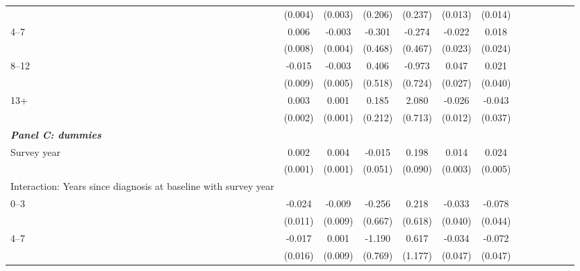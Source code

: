 \documentclass[12pt,english]{article}
\begin{document}
\begin{table}[p]
\begin{center}
\begin{adjustbox}{max width=.9\linewidth}
\begin{threeparttable}
{\begin{tabular}{l*{6}{S S}}
						&  (0.004)         &  (0.003)         &  (0.206)         &  (0.237)         &  (0.013)         &  (0.014)         \\
						\hspace*{10mm}4--7 &   0.006         &   -0.003         &   -0.301         &   -0.274         &   -0.022         &    0.018         \\
						&  (0.008)         &  (0.004)         &  (0.468)         &  (0.467)         &  (0.023)         &  (0.024)         \\
						\hspace*{10mm}8--12 &  -0.015\sym{*}  &   -0.003         &    0.406         &   -0.973         &    0.047\sym{*}  &    0.021         \\
						&  (0.009)         &  (0.005)         &  (0.518)         &  (0.724)         &  (0.027)         &  (0.040)         \\
						\hspace*{10mm}13+ &    0.003         &    0.001         &    0.185         &    2.080\sym{***}&   -0.026\sym{**} &   -0.043         \\
						&  (0.002)         &  (0.001)         &  (0.212)         &  (0.713)         &  (0.012)         &  (0.037)         \\
						\textit{\textbf{Panel C: dummies}} &&&&&&\\
						Survey year     &    0.002\sym{***}&    0.004\sym{***}&   -0.015         &    0.198\sym{**} &    0.014\sym{***}&    0.024\sym{***}\\
						&  (0.001)         &  (0.001)         &  (0.051)         &  (0.090)         &  (0.003)         &  (0.005)         \\
						Interaction: Years since diagnosis at baseline with survey year &&&&&&\\
						\hspace*{10mm}0--3&    -0.024\sym{**} &   -0.009         &   -0.256         &    0.218         &   -0.033         &   -0.078\sym{*}  \\
						&  (0.011)         &  (0.009)         &  (0.667)         &  (0.618)         &  (0.040)         &  (0.044)         \\
						\hspace*{10mm}4--7 &  -0.017         &    0.001         &   -1.190         &    0.617         &   -0.034         &   -0.072         \\
						&  (0.016)         &  (0.009)         &  (0.769)         &  (1.177)         &  (0.047)         &  (0.047)         \\

\end{tabular}}
\end{threeparttable}
\end{adjustbox}
\end{center}
\end{table}
\end{document}
